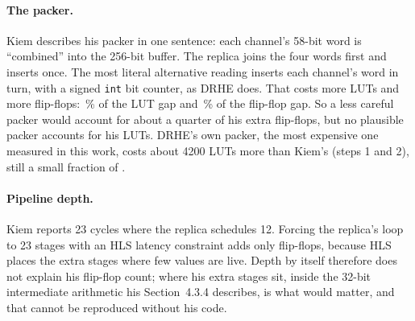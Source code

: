 \paragraph{The packer.} Kiem describes his packer in one sentence: each
channel's 58-bit word is ``combined'' into the 256-bit buffer. The replica
joins the four words first and inserts once. The most literal alternative
reading inserts each channel's word in turn, with a signed \texttt{int} bit
counter, as DRHE does. That costs  more LUTs and
 more flip-flops: \,\% of the
LUT gap and \,\% of the flip-flop gap. So a less
careful packer would account for about a quarter of his extra flip-flops, but
no plausible packer accounts for his LUTs. DRHE's own packer, the most
expensive one measured in this work, costs about \num{4200} LUTs more than
Kiem's (steps 1 and 2), still a small fraction of .

\paragraph{Pipeline depth.} Kiem reports 23 cycles where the replica
schedules 12. Forcing the replica's loop to 23 stages with an HLS latency
constraint adds only  flip-flops, because HLS places
the extra stages where few values are live. Depth by itself therefore does not
explain his flip-flop count; where his extra stages sit, inside the 32-bit
intermediate arithmetic his Section~4.3.4 describes, is what would matter, and
that cannot be reproduced without his code.

